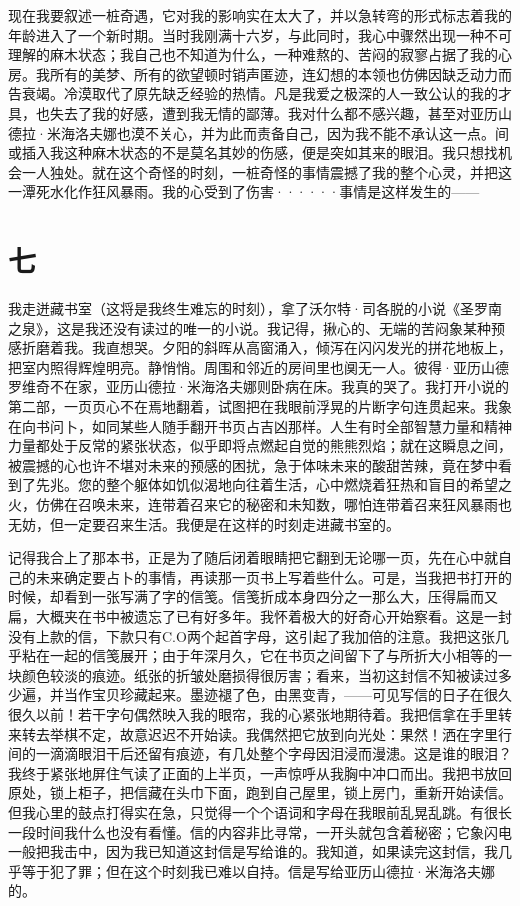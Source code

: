 \documentclass[12pt, UTF8]{ctexbook}
\begin{document}
\par 现在我要叙述一桩奇遇，它对我的影响实在太大了，并以急转弯的形式标志着我的年龄进入了一个新时期。当时我刚满十六岁，与此同时，我心中骤然出现一种不可理解的麻木状态；我自己也不知道为什么，一种难熬的、苦闷的寂寥占据了我的心房。我所有的美梦、所有的欲望顿时销声匿迹，连幻想的本领也仿佛因缺乏动力而告衰竭。冷漠取代了原先缺乏经验的热情。凡是我爱之极深的人一致公认的我的才具，也失去了我的好感，遭到我无情的鄙薄。我对什么都不感兴趣，甚至对亚历山德拉·米海洛夫娜也漠不关心，并为此而责备自己，因为我不能不承认这一点。间或插入我这种麻木状态的不是莫名其妙的伤感，便是突如其来的眼泪。我只想找机会一人独处。就在这个奇怪的时刻，一桩奇怪的事情震撼了我的整个心灵，并把这一潭死水化作狂风暴雨。我的心受到了伤害······事情是这样发生的——
\newpage
\section*{七}
\par 我走迸藏书室（这将是我终生难忘的时刻），拿了沃尔特·司各脱的小说《圣罗南之泉》，这是我还没有读过的唯一的小说。我记得，揪心的、无端的苦闷象某种预感折磨着我。我直想哭。夕阳的斜晖从高窗涌入，倾泻在闪闪发光的拼花地板上，把室内照得辉煌明亮。静悄悄。周围和邻近的房间里也阒无一人。彼得·亚历山德罗维奇不在家，亚历山德拉·米海洛夫娜则卧病在床。我真的哭了。我打开小说的第二部，一页页心不在焉地翻着，试图把在我眼前浮晃的片断字句连贯起来。我象在向书问卜，如同某些人随手翻开书页占吉凶那样。人生有时全部智慧力量和精神力量都处于反常的紧张状态，似乎即将点燃起自觉的熊熊烈焰；就在这瞬息之间，被震撼的心也许不堪对未来的预感的困扰，急于体味未来的酸甜苦辣，竟在梦中看到了先兆。您的整个躯体如饥似渴地向往着生活，心中燃烧着狂热和盲目的希望之火，仿佛在召唤未来，连带着召来它的秘密和未知数，哪怕连带着召来狂风暴雨也无妨，但一定要召来生活。我便是在这样的时刻走进藏书室的。
\par 记得我合上了那本书，正是为了随后闭着眼睛把它翻到无论哪一页，先在心中就自己的未来确定要占卜的事情，再读那一页书上写着些什么。可是，当我把书打开的时候，却看到一张写满了字的信笺。信笺折成本身四分之一那么大，压得扁而又扁，大概夹在书中被遗忘了已有好多年。我怀着极大的好奇心开始察看。这是一封没有上款的信，下款只有C.O两个起首字母，这引起了我加倍的注意。我把这张几乎粘在一起的信笺展开；由于年深月久，它在书页之间留下了与所折大小相等的一块颜色较淡的痕迹。纸张的折皱处磨损得很厉害；看来，当初这封信不知被读过多少遍，并当作宝贝珍藏起来。墨迹褪了色，由黑变青，——可见写信的日子在很久很久以前！若干字句偶然映入我的眼帘，我的心紧张地期待着。我把信拿在手里转来转去举棋不定，故意迟迟不开始读。我偶然把它放到向光处：果然！洒在字里行间的一滴滴眼泪干后还留有痕迹，有几处整个字母因泪浸而漫漶。这是谁的眼泪？我终于紧张地屏住气读了正面的上半页，一声惊呼从我胸中冲口而出。我把书放回原处，锁上柜子，把信藏在头巾下面，跑到自己屋里，锁上房门，重新开始读信。但我心里的鼓点打得实在急，只觉得一个个语词和字母在我眼前乱晃乱跳。有很长一段时间我什么也没有看懂。信的内容非比寻常，一开头就包含着秘密；它象闪电一般把我击中，因为我已知道这封信是写给谁的。我知道，如果读完这封信，我几乎等于犯了罪；但在这个时刻我已难以自持。信是写给亚历山德拉·米海洛夫娜的。
\end{document}
